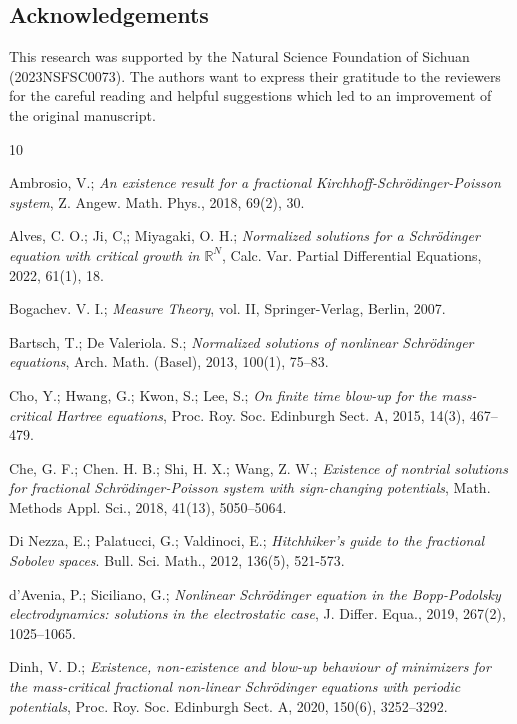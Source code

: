 \documentclass[reqno]{amsart}
\begin{document}
\subsection*{Acknowledgements}
This research was supported by the Natural Science Foundation of
Sichuan (2023NSFSC0073).
The authors want to express their gratitude to the reviewers for the careful reading and
helpful suggestions which led to an improvement of the original
manuscript.


\begin{thebibliography}{10}

  Ambrosio,  V.;
\emph{An existence result for a fractional Kirchhoff-Schr\"odinger-Poisson system},
 Z. Angew. Math. Phys., 2018, 69(2),  30.

 Alves, C. O.; Ji, C,; Miyagaki, O. H.;
\emph{Normalized solutions for a Schr\"odinger  equation with critical growth in 
$\mathbb{R}^N$}, Calc. Var. Partial Differential Equations, 2022,   61(1), 18.

   Bogachev. V. I.;
\emph{Measure Theory}, vol. II, Springer-Verlag, Berlin, 2007.

 Bartsch, T.; De Valeriola. S.;
\emph{Normalized solutions of nonlinear Schr\"odinger equations},
 Arch. Math. (Basel), 2013,  100(1), 75--83.

   Cho, Y.;  Hwang,  G.;  Kwon, S.;  Lee, S.;
\emph{On finite time blow-up for the mass-critical Hartree equations},
Proc. Roy. Soc. Edinburgh Sect. A,  2015,  14(3), 467--479.

 Che, G. F.; Chen. H. B.; Shi, H. X.; Wang, Z. W.;
\emph{Existence of nontrial solutions for fractional Schr\"odinger-Poisson 
system with sign-changing  potentials}, 
Math. Methods Appl. Sci., 2018, 41(13), 5050--5064.

  Di Nezza, E.; Palatucci, G.; Valdinoci, E.;
\emph{Hitchhiker's guide to the fractional Sobolev spaces}. 
Bull. Sci. Math., 2012, 136(5), 521-573.

 d'Avenia, P.;  Siciliano, G.;
\emph{Nonlinear Schr\"odinger equation in the Bopp-Podolsky electrodynamics: 
solutions in the electrostatic case}, J. Differ. Equa.,  2019,  267(2), 1025--1065.

 Dinh, V. D.;
\emph{Existence, non-existence and blow-up behaviour of minimizers for the 
mass-critical fractional non-linear Schr\"odinger equations with periodic potentials},
Proc. Roy. Soc. Edinburgh Sect. A,  2020,  150(6), 3252--3292.


\end{thebibliography}
\end{document}

